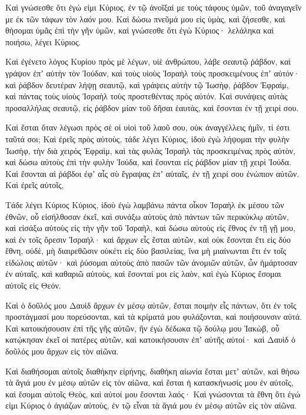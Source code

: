 {Καὶ γνώσεσθε ὅτι ἐγώ εἰμι Κύριος, ἐν τῷ ἀνοῖξαί με τοὺς τάφους ὑμῶν, τοῦ ἀναγαγεῖν με ἐκ τῶν τάφων τὸν λαόν μου.
Καὶ δώσω πνεῦμά μου εἰς ὑμὰς, καὶ ζήσεσθε, καὶ θήσομαι ὑμᾶς ἐπὶ τὴν γῆν ὑμῶν, καὶ γνώσεσθε ὅτι ἐγὼ Κύριος· λελάληκα καὶ ποιήσω, λέγει Κύριος.
\par }{\PP {}Καὶ ἐγένετο λόγος Κυρίου πρὸς μὲ λέγων,
υἱὲ ἀνθρώπου, λάβε σεαυτῷ ῥάβδον, καὶ γράψον ἐπʼ αὐτὴν τὸν Ἰούδαν, καὶ τοὺς υἱοὺς Ἰσραὴλ τοὺς προσκειμένους ἐπʼ αὐτόν· καὶ ῥάβδον δευτέραν λήψῃ σεαυτῷ, καὶ γράψεις αὐτὴν τῷ Ἰωσὴφ, ῥάβδον Ἐφραὶμ, καὶ πάντας τοὺς υἱοὺς Ἰσραὴλ τοὺς προστεθέντας πρὸς αὐτόν.
Καὶ συνάψεις αὐτὰς προσαλλήλας σεαυτῷ, εἰς ῥάβδον μίαν τοῦ δῆσαι ἑαυτὰς, καὶ ἔσονται ἐν τῇ χειρί σου.
\par }{\PP {}Καὶ ἔσται ὅταν λέγωσι πρὸς σὲ οἱ υἱοὶ τοῦ λαοῦ σου, οὐκ ἀναγγέλλεις ἡμῖν, τί ἐστι ταῦτά σοι;
Καὶ ἐρεῖς πρὸς αὐτοὺς, τάδε λέγει Κύριος, ἰδοὺ ἐγὼ λήψομαι τὴν φυλὴν Ἰωσὴφ, τὴν διὰ χειρὸς Ἐφραὶμ, καὶ τὰς φυλὰς Ἰσραὴλ τὰς προσκειμένας πρὸς αὐτὸν, καὶ δώσω αὐτοὺς ἐπὶ τὴν φυλὴν Ἰούδα, καὶ ἔσονται εἰς ῥάβδον μίαν τῇ χειρὶ Ἰούδα.
Καὶ ἔσονται αἱ ῥάβδοι ἐφʼ αἷς σὺ ἔγραψας ἐπʼ αὐταῖς, ἐν τῇ χειρί σου ἐνώπιον αὐτῶν.
Καὶ ἐρεῖς αὐτοῖς,
\par }{\PP Τάδε λέγει Κύριος Κύριος, ἰδοὺ ἐγὼ λαμβάνω πάντα οἶκον Ἰσραὴλ ἐκ μέσου τῶν ἐθνῶν, οὗ εἰσήλθοσαν ἐκεῖ, καὶ συνάξω αὐτοὺς ἀπὸ πάντων τῶν περικύκλῳ αὐτῶν, καὶ εἰσάξω αὐτοὺς εἰς τὴν γῆν τοῦ Ἰσραὴλ,
καὶ δώσω αὐτοὺς εἰς ἔθνος ἐν τῇ γῇ μου, καὶ ἐν τοῖς ὄρεσιν Ἰσραήλ· καὶ ἄρχων εἷς ἔσται αὐτῶν, καὶ οὐκ ἔσονται ἔτι εἰς δύο ἔθνη, οὐδὲ, μὴ διαιρεθῶσιν οὐκέτι εἰς δύο βασιλείας,
ἵνα μὴ μιαίνωνται ἔτι ἐν τοῖς εἰδώλοις αὐτῶν· καὶ ῥύσομαι αὐτοὺς ἀπὸ πασῶν τῶν ἀνομιῶν αὐτῶν, ὧν ἡμάρτοσαν ἐν αὐταῖς, καὶ καθαριῶ αὐτοὺς, καὶ ἔσονταί μοι εἰς λαὸν, καὶ ἐγὼ Κύριος ἔσομαι αὐτοῖς εἰς Θεόν.
\par }{\PP {}Καὶ ὁ δοῦλός μου Δαυὶδ ἄρχων ἐν μέσῳ αὐτῶν, ἔσται ποιμὴν εἷς πάντων, ὅτι ἐν τοῖς προστάγμασί μου πορεύσονται, καὶ τὰ κρίματά μου φυλάξονται, καὶ ποιήσουνσιν αὐτά.
Καὶ κατοικήσουσιν ἐπὶ τῆς γῆς αὐτῶν, ἣν ἐγὼ δέδωκα τῷ δούλῳ μου Ἰακὼβ, οὗ κατῴκησαν ἐκεῖ οἱ πατέρες αὐτῶν, καὶ κατοικήσουσιν ἐπʼ αὐτῆς αὐτοί· καὶ Δαυὶδ ὁ δοῦλός μου ἄρχων εἰς τὸν αἰῶνα.
\par }{\PP {}Καὶ διαθήσομαι αὐτοῖς διαθήκην εἰρήνης, διαθήκη αἰωνία ἔσται μετʼ αὐτῶν, καὶ θήσω τὰ ἅγιά μου ἐν μέσῳ αὐτῶν εἰς τὸν αἰῶνα,
καὶ ἔσται ἡ κατασκήνωσίς μου ἐν αὐτοῖς, καὶ ἔσομαι αὐτοῖς Θεὸς, καὶ αὐτοί μου ἔσονται λαός·
Καὶ γνώσονται τὰ ἔθνη ὅτι ἐγώ εἰμι Κύριος ὁ ἁγιάζων αὐτοὺς, ἐν τῷ εἶναι τὰ ἅγιά μου ἐν μέσῳ αὐτῶν εἰς τὸν αἰῶνα.

}
